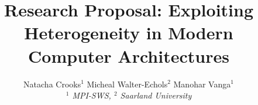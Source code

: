 

\newif \ifDraft\Drafttrue

\ifDraft
  \newcommand{\Comment}[1]{\textbf{\textsl{#1}}}
\else
  \newcommand{\Comment}[1]{\relax}
\fi

\newcommand{\gernot}[1]{\Comment{#1 [gernot]}}


\title{\vspace{-0.8cm}\textbf{
Research Proposal: Exploiting Heterogeneity in Modern Computer Architectures
}}

\author{
Natacha Crooks$^1$ \quad
Micheal Walter-Echols$^2$ \quad
Manohar Vanga$^1$
\\ \emph{$^1$ MPI-SWS, $^2$ Saarland University}
}
\date{\vspace{-12pt}}




\maketitle






\fontsize{8}{8.2}
\selectfont


\normalsize

